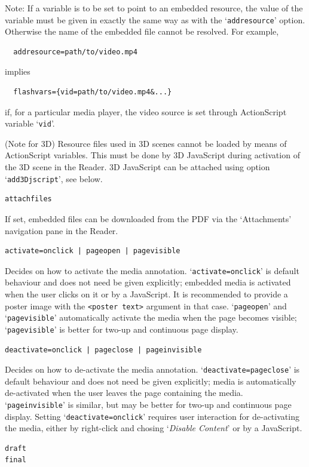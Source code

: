 \documentclass[a4paper]{article}
\begin{document}
Note: If a variable is to be set to point to an embedded resource, the value of the variable must be given in exactly the same way as with the `\verb+addresource+' option. Otherwise the name of the embedded file cannot be resolved. For example,
\begin{verbatim}
  addresource=path/to/video.mp4
\end{verbatim}
implies
\begin{verbatim}
  flashvars={vid=path/to/video.mp4&...}
\end{verbatim}
if, for a particular media player, the video source is set through ActionScript variable `\verb+vid+'.

(Note for 3D) Resource files used in 3D scenes cannot be loaded by means of ActionScript variables. This must be done by 3D JavaScript during activation of the 3D scene in the Reader. 3D JavaScript can be attached using option `\verb+add3Djscript+', see below.
\begin{verbatim}
attachfiles
\end{verbatim}
If set, embedded files can be downloaded from the PDF via the `Attachments' navigation pane in the Reader.
\begin{verbatim}
activate=onclick | pageopen | pagevisible
\end{verbatim}
Decides on how to activate the media annotation. `\verb+activate=onclick+' is default behaviour and does not need be given explicitly; embedded media is activated when the user clicks on it or by a JavaScript. It is recommended to provide a poster image with the \verb+<poster text>+ argument in that case. `\verb+pageopen+' and `\verb+pagevisible+' automatically activate the media when the page becomes visible; `{\tt pagevisible}' is better for two-up and continuous page display.
\begin{verbatim}
deactivate=onclick | pageclose | pageinvisible
\end{verbatim}
Decides on how to de-activate the media annotation. `\verb+deactivate=pageclose+' is default behaviour and does not need be given explicitly; media is automatically de-activated when the user leaves the page containing the media. `\verb+pageinvisible+' is similar, but may be better for two-up and continuous page display. Setting `\verb+deactivate=onclick+' requires user interaction for de-activating the media, either by right-click and chosing `\emph{\sffamily Disable Content}' or by a JavaScript.
\hypertarget{draftfinal}{}%
\begin{verbatim}
draft
final
\end{verbatim}
\end{document}
